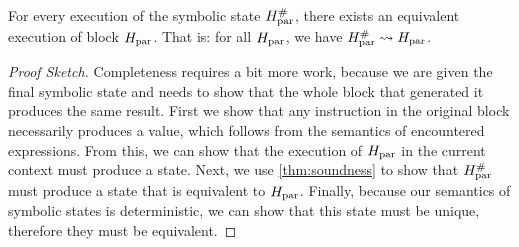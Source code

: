 {%




\begin{lemma}\label{thm:completeness}
  For every execution of the symbolic state $H_\text{par}^{\#}$, there exists an
  equivalent execution of block $H_\text{par}$. That is: for all $H_\text{par}$, we have
  $H_\text{par}^{\#} \mathrel{\leadsto} H_\text{par}$.

  \begin{proof}[Proof Sketch]
    Completeness requires a bit more work, because we are given the final
    symbolic state and needs to show that the whole block that generated it
    produces the same result.  First we show that any instruction in the
    original block necessarily produces a value, which follows from the
    semantics of encountered expressions.  From this, we can show that the
    execution of $H_\text{par}$ in the current context must produce a state. Next, we
    use \cref{thm:soundness} to show that $H_\text{par}^{\#}$ must produce a
    state that is equivalent to $H_\text{par}$. Finally, because our semantics of
    symbolic states is deterministic, we can show that this state must be
    unique, therefore they must be equivalent.
  \end{proof}
\end{lemma}



}
